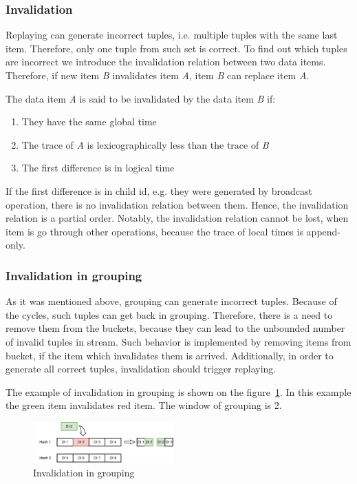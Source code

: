 \subsubsection{Invalidation}
Replaying can generate incorrect tuples, i.e. multiple tuples with the same last item. Therefore, only one tuple from such set is correct. To find out which tuples are incorrect we introduce the invalidation relation between two data items. Therefore, if new item {\it B} invalidates item {\it A}, item {\it B} can replace item {\it A}.

The data item {\it A} is said to be invalidated by the data item {\it B} if:
\begin{enumerate}
\item They have the same global time
\item The trace of {\it A} is lexicographically less than the trace of {\it B}
\item The first difference is in logical time
\end{enumerate}
If the first difference is in child id, e.g. they were generated by broadcast operation, there is no invalidation relation between them. Hence, the invalidation relation is a partial order. Notably, the invalidation relation cannot be lost, when item is go through other operations, because the trace of local times is append-only.

\subsubsection{Invalidation in grouping}
As it was mentioned above, grouping can generate incorrect tuples. Because of the cycles, such tuples can get back in grouping. Therefore, there is a need to remove them from the buckets, because they can lead to the unbounded number of invalid tuples in stream. Such behavior is implemented by removing items from bucket, if the item which invalidates them is arrived. Additionally, in order to generate all correct tuples, invalidation should trigger replaying. 

The example of invalidation in grouping is shown on the figure~\ref{grouping-invalidation-figure}. In this example the green item invalidates red item. The window of grouping is 2.

\begin{figure}[htbp]
  \centering
  \includegraphics[width=0.48\textwidth]{pics/grouping-invalidation}
  \caption{Invalidation in grouping}
  \label {grouping-invalidation-figure}
\end{figure}

